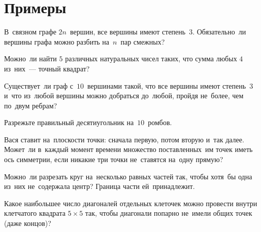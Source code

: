 

\section*{Примеры}


\begin{problems}

\item
В~связном графе $2n$~вершин, все вершины имеют степень~$3$.
Обязательно~ли вершины графа можно разбить на~$n$~пар смежных?

\item
Можно~ли найти $5$ различных натуральных чисел таких, что сумма любых
$4$ из~них~--- точный квадрат?

\item
Существует~ли граф с~$10$~вершинами такой, что все вершины имеют степень~$3$
и~что из~любой вершины можно добраться до~любой, пройдя не~более, чем по~двум
ребрам?

\item
Разрежьте правильный десятиугольник на~$10$~ромбов.

\item
Вася ставит на~плоскости точки: сначала первую, потом вторую и~так далее.
Может~ли в~каждый момент времени множество поставленных~им точек иметь ось
симметрии, если никакие три точки не~ставятся на~одну прямую?

\item
Можно~ли разрезать круг на~несколько равных частей так, чтобы хотя~бы одна
из~них не~содержала центр?
Граница части ей~принадлежит.

\item
Какое наибольшее число диагоналей отдельных клеточек можно провести внутри
клетчатого квадрата $5 \times 5$ так, чтобы диагонали попарно не~имели общих
точек (даже концов)?

\end{problems}

